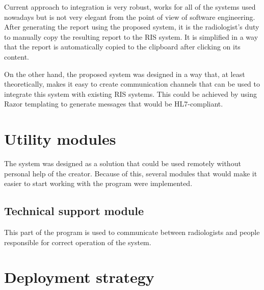 \documentclass[12pt, twoside, openany]{report}
\theoremstyle{definition}
\begin{document}
Current approach to integration is very robust, works for all of the systems used nowadays but is not very elegant from the point of view of software engineering. 
After generating the report using the proposed system, it is the radiologist's duty to manually copy the resulting report to the RIS system. It is simplified in a way that the report is automatically copied to the clipboard after clicking on its content.

On the other hand, the proposed system was designed in a way that, at least theoretically, makes it easy to create communication channels that can be used to integrate this system with existing RIS systems. This could be achieved by using Razor templating to generate messages that would be HL7-compliant. 

\section{Utility modules}
The system was designed as a solution that could be used remotely without personal help of the creator. Because of this, several modules that would make it easier to start working with the program were implemented. 
\subsection{Technical support module}
This part of the program is used to communicate between radiologists and people responsible for correct operation of the system. 

\section{Deployment strategy}
\end{document}
